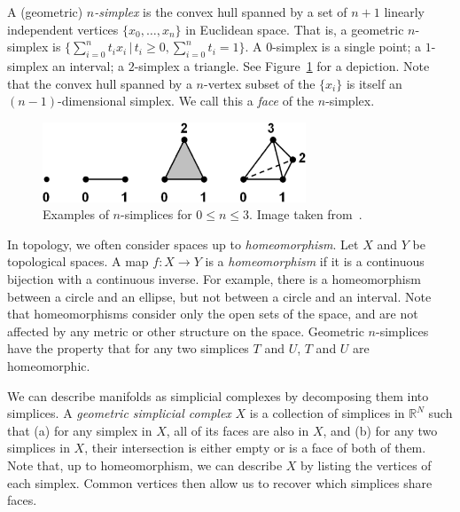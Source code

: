 \documentclass[a4paper,11pt,leqno]{article}
\newcommand{\RR}{\mathbb{R}}
\theoremstyle{definition}
\begin{document}
A (geometric) \emph{$n$-simplex} is the convex hull spanned by a set of $n+1$ linearly independent vertices $\{x_0,\dots, x_n\}$ in Euclidean space.
That is, a geometric $n$-simplex is $\{\sum_{i=0}^n t_ix_i\,|\, t_i\geq 0, \sum_{i=0}^n t_i = 1\}$.
A $0$-simplex is a single point; a $1$-simplex an interval; a $2$-simplex a triangle.
See Figure~\ref{fig_simplices} for a depiction.
Note that the convex hull spanned by a $n$-vertex subset of the $\{x_i\}$ is itself an $(n-1)$-dimensional simplex.
We call this a \emph{face} of the $n$-simplex.

\begin{figure}
	\centering
	\includegraphics[width=0.7\textwidth]{figures/simp2.jpg}
	\caption{Examples of $n$-simplices for $0\leq n\leq 3$. Image taken from~\cite{Friedman08}.}
	\label{fig_simplices}
\end{figure}

In topology, we often consider spaces up to \emph{homeomorphism}.
Let $X$ and $Y$ be topological spaces.
A map $f: X\to Y$ is a \emph{homeomorphism} if it is a continuous bijection with a continuous inverse.
For example, there is a homeomorphism between a circle and an ellipse, but not between a circle and an interval.
Note that homeomorphisms consider only the open sets of the space, and are not affected by any metric or other structure on the space.
Geometric $n$-simplices have the property that for any two simplices $T$ and $U$, $T$ and $U$ are homeomorphic.

We can describe manifolds as simplicial complexes by decomposing them into simplices.
A \emph{geometric simplicial complex} $X$ is a collection of simplices in $\RR^N$ such that (a) for any simplex in $X$, all of its faces are also in $X$, and (b) for any two simplices in $X$, their intersection is either empty or is a face of both of them.
Note that, up to homeomorphism, we can describe $X$ by listing the vertices of each simplex.
Common vertices then allow us to recover which simplices share faces.
\end{document}

